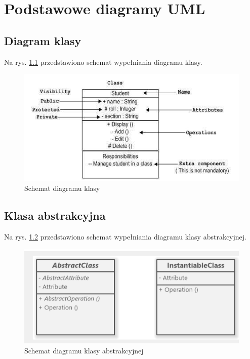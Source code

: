 \documentclass[a4paper,11pt]{report}
\begin{document}
\tableofcontents

\chapter{Podstawowe diagramy UML}
\section{Diagram klasy}
Na rys. \ref{fig:classDiagram} przedstawiono schemat wypełniania diagramu klasy.
\begin{figure}[H]
	\centering
	\includegraphics{figures/classDiagram}
	\caption{Schemat diagramu klasy \cite{learnUml}}
	\label{fig:classDiagram}
\end{figure}

\section{Klasa abstrakcyjna}
Na rys. \ref{fig:abstractClassDiagram} przedstawiono schemat wypełniania diagramu 
klasy abstrakcyjnej.
\begin{figure}[H]
	\centering
	\includegraphics{figures/abstractClassDiagram.png}
	\caption{Schemat diagramu klasy abstrakcyjnej \cite{abstractClass}}
	\label{fig:abstractClassDiagram}
\end{figure}
\end{document}
